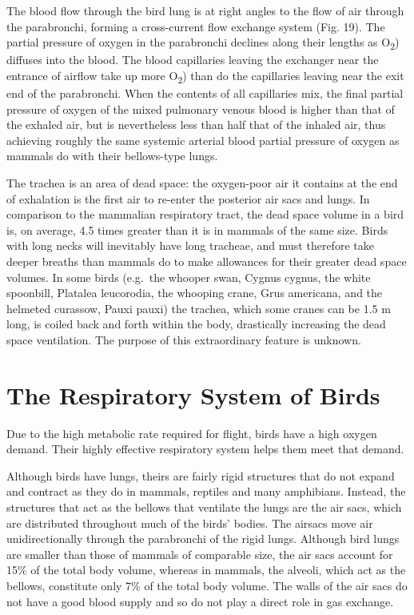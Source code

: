 The blood flow through the bird lung is at right angles to the flow of air through the parabronchi, forming a cross-current flow exchange system (Fig. 19). The partial pressure of oxygen in the parabronchi declines along their lengths as O\textsubscript{2}) diffuses into the blood. The blood capillaries leaving the exchanger near the entrance of airflow take up more O\textsubscript{2}) than do the capillaries leaving near the exit end of the parabronchi. When the contents of all capillaries mix, the final partial pressure of oxygen of the mixed pulmonary venous blood is higher than that of the exhaled air, but is nevertheless less than half that of the inhaled air, thus achieving roughly the same systemic arterial blood partial pressure of oxygen as mammals do with their bellows-type lungs.

The trachea is an area of dead space: the oxygen-poor air it contains at the end of exhalation is the first air to re-enter the posterior air sacs and lungs. In comparison to the mammalian respiratory tract, the dead space volume in a bird is, on average, 4.5 times greater than it is in mammals of the same size. Birds with long necks will inevitably have long tracheae, and must therefore take deeper breaths than mammals do to make allowances for their greater dead space volumes. In some birds (e.g.~the whooper swan, Cygnus cygnus, the white spoonbill, Platalea leucorodia, the whooping crane, Grus americana, and the helmeted curassow, Pauxi pauxi) the trachea, which some cranes can be 1.5 m long, is coiled back and forth within the body, drastically increasing the dead space ventilation. The purpose of this extraordinary feature is unknown.

\hypertarget{the-respiratory-system-of-birds}{%
\section{The Respiratory System of Birds}\label{the-respiratory-system-of-birds}}

Due to the high metabolic rate required for flight, birds have a high oxygen demand. Their highly effective respiratory system helps them meet that demand.

Although birds have lungs, theirs are fairly rigid structures that do not expand and contract as they do in mammals, reptiles and many amphibians. Instead, the structures that act as the bellows that ventilate the lungs are the air sacs, which are distributed throughout much of the birds' bodies. The airsacs move air unidirectionally through the parabronchi of the rigid lungs. Although bird lungs are smaller than those of mammals of comparable size, the air sacs account for 15\% of the total body volume, whereas in mammals, the alveoli, which act as the bellows, constitute only 7\% of the total body volume. The walls of the air sacs do not have a good blood supply and so do not play a direct role in gas exchange.

